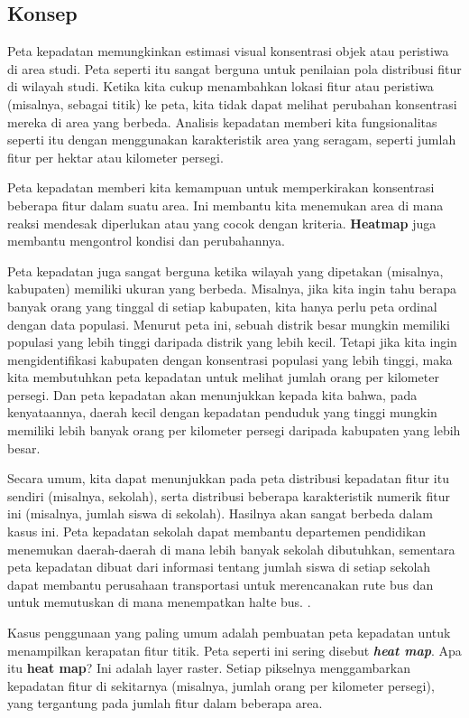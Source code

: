 \documentclass[]{book}
\begin{document}
\hypertarget{konsep-1}{%
\subsection{Konsep}\label{konsep-1}}

Peta kepadatan memungkinkan estimasi visual konsentrasi objek atau peristiwa di area studi. Peta seperti itu sangat berguna untuk penilaian pola distribusi fitur di wilayah studi. Ketika kita cukup menambahkan lokasi fitur atau peristiwa (misalnya, sebagai titik) ke peta, kita tidak dapat melihat perubahan konsentrasi mereka di area yang berbeda. Analisis kepadatan memberi kita fungsionalitas seperti itu dengan menggunakan karakteristik area yang seragam, seperti jumlah fitur per hektar atau kilometer persegi.

Peta kepadatan memberi kita kemampuan untuk memperkirakan konsentrasi beberapa fitur dalam suatu area. Ini membantu kita menemukan area di mana reaksi mendesak diperlukan atau yang cocok dengan kriteria. \textbf{Heatmap} juga membantu mengontrol kondisi dan perubahannya.

Peta kepadatan juga sangat berguna ketika wilayah yang dipetakan (misalnya, kabupaten) memiliki ukuran yang berbeda. Misalnya, jika kita ingin tahu berapa banyak orang yang tinggal di setiap kabupaten, kita hanya perlu peta ordinal dengan data populasi. Menurut peta ini, sebuah distrik besar mungkin memiliki populasi yang lebih tinggi daripada distrik yang lebih kecil. Tetapi jika kita ingin mengidentifikasi kabupaten dengan konsentrasi populasi yang lebih tinggi, maka kita membutuhkan peta kepadatan untuk melihat jumlah orang per kilometer persegi. Dan peta kepadatan akan menunjukkan kepada kita bahwa, pada kenyataannya, daerah kecil dengan kepadatan penduduk yang tinggi mungkin memiliki lebih banyak orang per kilometer persegi daripada kabupaten yang lebih besar.

Secara umum, kita dapat menunjukkan pada peta distribusi kepadatan fitur itu sendiri (misalnya, sekolah), serta distribusi beberapa karakteristik numerik fitur ini (misalnya, jumlah siswa di sekolah). Hasilnya akan sangat berbeda dalam kasus ini. Peta kepadatan sekolah dapat membantu departemen pendidikan menemukan daerah-daerah di mana lebih banyak sekolah dibutuhkan, sementara peta kepadatan dibuat dari informasi tentang jumlah siswa di setiap sekolah dapat membantu perusahaan transportasi untuk merencanakan rute bus dan untuk memutuskan di mana menempatkan halte bus. .

Kasus penggunaan yang paling umum adalah pembuatan peta kepadatan untuk menampilkan kerapatan fitur titik. Peta seperti ini sering disebut \textbf{\emph{heat map}}. Apa itu \textbf{heat map}? Ini adalah layer raster. Setiap pikselnya menggambarkan kepadatan fitur di sekitarnya (misalnya, jumlah orang per kilometer persegi), yang tergantung pada jumlah fitur dalam beberapa area.
\end{document}
